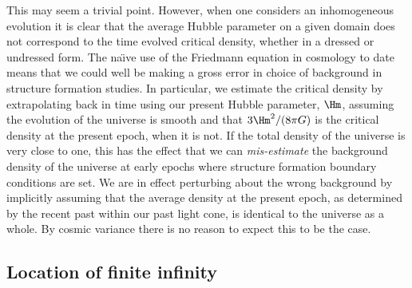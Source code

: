\documentclass[12pt]{iopart}
\begin{document}
This may seem a trivial point. However, when one considers
an inhomogeneous evolution it is clear that the average Hubble parameter
on a given domain does not correspond to the time evolved critical density,
whether in a dressed or undressed form. The na\"{\i}ve use of the Friedmann
equation in cosmology to date means that we could well be making a gross
error in choice of background in structure formation studies. In
particular, we estimate the critical density by extrapolating back in time
using our present Hubble parameter, $\Hm$, assuming the evolution of the
universe is smooth and that $3\Hm^2/(8\pi G)$ is the critical density at the
present epoch, when it is not.
If the total density of the universe is very close to one, this has the
effect that we can {\em mis-estimate} the background density of the universe
at early epochs where structure formation boundary conditions are set.
We are in effect perturbing about the wrong background by implicitly
assuming that the average density at the present epoch, as determined by
the recent past within our past light cone, is identical to the universe
as a whole. By cosmic variance there is no reason to expect this to be
the case.

\subsection{Location of finite infinity}
\end{document}
